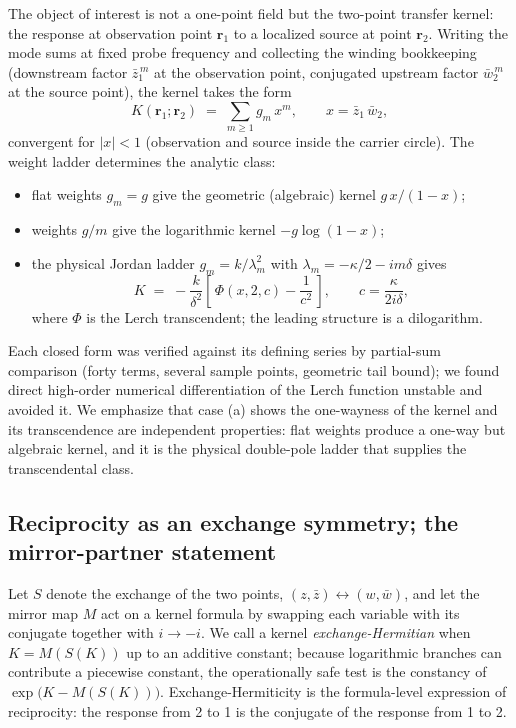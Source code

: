\documentclass[11pt,a4paper]{article}
\newcommand{\zb}{\bar{z}}
\newcommand{\wb}{\bar{w}}
\newcommand{\zbone}{\bar{z}_1}
\newcommand{\wbtwo}{\bar{w}_2}
\begin{document}
The object of interest is not a one-point field but the two-point transfer
kernel: the response at observation point $\mathbf{r}_1$ to a localized source at
point $\mathbf{r}_2$. Writing the mode sums at fixed probe frequency and
collecting the winding bookkeeping (downstream factor $\zbone^{\,m}$ at the
observation point, conjugated upstream factor $\wbtwo^{\,m}$ at the source
point), the kernel takes the form
\begin{equation}
K(\mathbf{r}_1;\mathbf{r}_2) \;=\; \sum_{m \geq 1} g_m\, x^m,
\qquad x = \zbone\,\wbtwo,
\label{eq:kernelsum}
\end{equation}
convergent for $|x| < 1$ (observation and source inside the carrier circle). The
weight ladder determines the analytic class:
\begin{itemize}
\item[(a)] flat weights $g_m = g$ give the geometric (algebraic) kernel
  $g\,x/(1 - x)$;
\item[(b)] weights $g/m$ give the logarithmic kernel $-g \log(1 - x)$;
\item[(c)] the physical Jordan ladder $g_m = k / \lambda_m^2$ with
  $\lambda_m = -\kappa/2 - i m \delta$ gives
  \begin{equation}
  K \;=\; -\frac{k}{\delta^{2}} \left[\, \Phi(x, 2, c) - \frac{1}{c^{2}} \,\right],
  \qquad c = \frac{\kappa}{2 i \delta},
  \label{eq:lerch}
  \end{equation}
  where $\Phi$ is the Lerch transcendent; the leading structure is a
  dilogarithm.
\end{itemize}
Each closed form was verified against its defining series by partial-sum
comparison (forty terms, several sample points, geometric tail bound); we found
direct high-order numerical differentiation of the Lerch function unstable and
avoided it. We emphasize that case (a) shows the one-wayness of the kernel and
its transcendence are independent properties: flat weights produce a one-way
but algebraic kernel, and it is the physical double-pole ladder that supplies
the transcendental class.

\subsection{Reciprocity as an exchange symmetry; the mirror-partner statement}
\label{sec:mirror}

Let $S$ denote the exchange of the two points, $(z, \zb) \leftrightarrow (w, \wb)$,
and let the mirror map $M$ act on a kernel formula by swapping each variable with
its conjugate together with $i \to -i$. We call a kernel
\emph{exchange-Hermitian} when $K = M(S(K))$ up to an additive constant; because
logarithmic branches can contribute a piecewise constant, the operationally safe
test is the constancy of $\exp\!\bigl(K - M(S(K))\bigr)$. Exchange-Hermiticity
is the formula-level expression of reciprocity: the response from 2 to 1 is the
conjugate of the response from 1 to 2.
\end{document}
